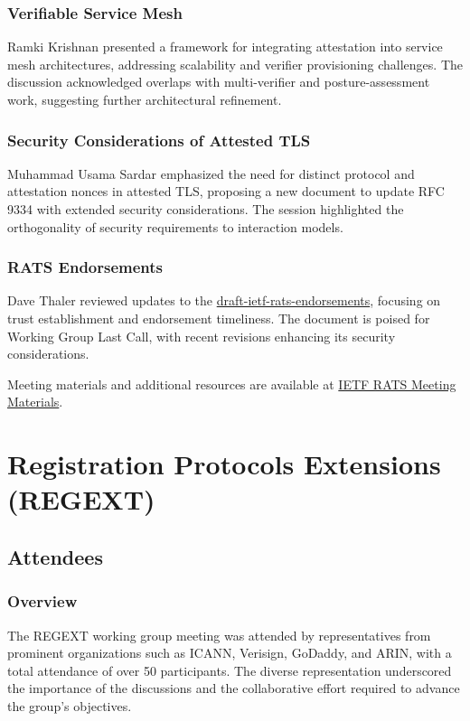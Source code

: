 \documentclass{article}
\begin{document}
\subsubsection{Verifiable Service Mesh}
Ramki Krishnan presented a framework for integrating attestation into service mesh architectures, addressing scalability and verifier provisioning challenges. The discussion acknowledged overlaps with multi-verifier and posture-assessment work, suggesting further architectural refinement.

\subsubsection{Security Considerations of Attested TLS}
Muhammad Usama Sardar emphasized the need for distinct protocol and attestation nonces in attested TLS, proposing a new document to update RFC 9334 with extended security considerations. The session highlighted the orthogonality of security requirements to interaction models.

\subsubsection{RATS Endorsements}
Dave Thaler reviewed updates to the \href{https://datatracker.ietf.org/doc/html/draft-ietf-rats-endorsements}{draft-ietf-rats-endorsements}, focusing on trust establishment and endorsement timeliness. The document is poised for Working Group Last Call, with recent revisions enhancing its security considerations.

Meeting materials and additional resources are available at \href{https://datatracker.ietf.org/meeting/121/materials/agenda-121-rats-00}{IETF RATS Meeting Materials}.



\newpage

\section{Registration Protocols Extensions (REGEXT)}

\subsection{Attendees}
\subsubsection{Overview}
The REGEXT working group meeting was attended by representatives from prominent organizations such as ICANN, Verisign, GoDaddy, and ARIN, with a total attendance of over 50 participants. The diverse representation underscored the importance of the discussions and the collaborative effort required to advance the group's objectives.
\end{document}
